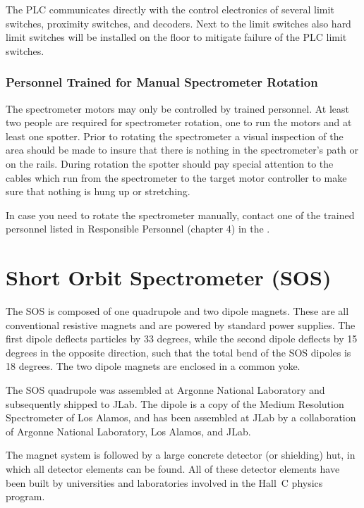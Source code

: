 The PLC communicates directly with the control electronics of several limit
switches, proximity switches, and decoders. Next to the limit switches
also hard limit switches will be installed on the floor to mitigate failure
of the PLC limit switches.


\subsubsection{Personnel Trained for Manual Spectrometer Rotation}

The spectrometer motors may only be controlled by trained personnel.
At least two people are required for spectrometer rotation, one to
run the motors and at least one spotter. Prior to rotating the spectrometer
a visual inspection of the area should be made to insure that there
is nothing in the spectrometer's path or on the rails. During rotation
the spotter should pay special attention to
the cables which run from the
spectrometer to the target motor controller to make sure that
nothing is hung up or stretching.

In case you need to rotate the spectrometer manually, contact one of the trained
personnel listed in Responsible Personnel (chapter 4) in
the .

\section{Short Orbit Spectrometer (SOS) }

The SOS is composed of one quadrupole and two dipole magnets.
These are all conventional resistive magnets and are powered by standard
power supplies.
The first dipole deflects particles by 33 degrees, while the
second dipole deflects by 15 degrees in the opposite direction, such
that the total bend of the SOS dipoles is 18 degrees.
The two dipole magnets are enclosed in a common yoke.

The SOS quadrupole was assembled at Argonne National Laboratory and
subsequently shipped to JLab. The dipole is a copy of the Medium Resolution
Spectrometer of Los Alamos, and has been assembled at JLab by a collaboration
of Argonne National Laboratory, Los Alamos, and JLab.

The magnet system is followed by a large concrete detector (or shielding) hut,
in which all detector elements can be found. All of these
detector elements have been built by universities and laboratories involved 
in the Hall~C
physics program.


